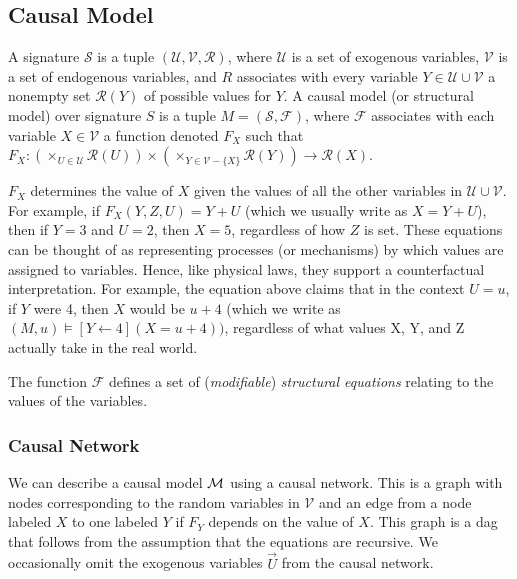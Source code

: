 \subsection{Causal Model \cite{hp}}
A signature $\mathcal{S}$ is a tuple $(\mathcal{U},\mathcal{V},\mathcal{R})$,
where $\mathcal{U}$ is a set of exogenous variables, $\mathcal{V}$
is a set of endogenous variables, and $R$ associates with every variable
$Y\in \mathcal{U}\cup \mathcal{V}$ a nonempty set $\mathcal{R}(Y)$ of possible values for $Y$.
A causal model (or structural model) over signature $S$ is a tuple
$M=(\mathcal{S},\mathcal{F})$, where $\mathcal{F}$ associates with
each variable $X \in \mathcal{V}$ a function denoted $F_X$ such that
$F_X: (\times_{U\in \mathcal{U}}\mathcal{R}(U))\times (\times_{Y\in\mathcal{V}-\{X\}}\mathcal{R}(Y))\rightarrow \mathcal{R}(X)$.

$F_X$ determines the value of $X$ given the values of all the other variables
in $\mathcal{U}\cup \mathcal{V}$.
For example, if $F_X(Y,Z,U)=Y+U$ (which we usually write as $X = Y + U$),
then if $Y=3$ and $U=2$, then $X = 5$, regardless of how $Z$ is set.
These equations can be thought of as representing processes (or mechanisms) by which values are assigned to variables. Hence, like physical laws, they support a counterfactual interpretation.
For example, the equation above claims that in the context $U=u$, if $Y$ were 4, then $X$ would be $u+4$ (which we write as $(M,u) \models [Y\leftarrow 4](X = u + 4))$, regardless of what values X, Y, and Z actually take in the real world.


The function $\mathcal{F}$ defines a set of (\textit{modifiable}) \textit{structural equations} relating to the values of the variables.

\subsubsection{Causal Network}
We can describe a causal model $\mathcal{M}$ using a causal network.
This is a graph with nodes corresponding to the random variables
in $\mathcal{V}$ and an edge from a node labeled $X$ to one
labeled $Y$ if $F_Y$ depends on the value of $X$.
This graph is a dag that follows from the assumption that the
equations are recursive.
We occasionally omit the exogenous variables $\vec U$ from the causal network.

